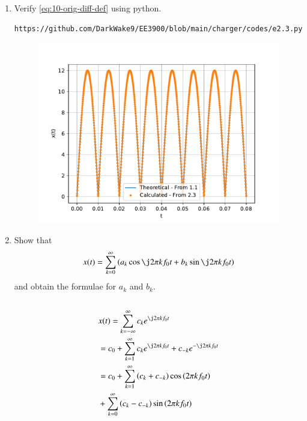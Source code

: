 \documentclass[journal,12pt,twocolumn]{IEEEtran}
\renewcommand\thesection{\arabic{section}}
\begin{document}
\begin{enumerate}[label=\thesection.\arabic*,ref=\thesection.\theenumi]
\item Verify 
	\eqref{eq:10-orig-diff-def}
	using python.
\begin{lstlisting}
https://github.com/DarkWake9/EE3900/blob/main/charger/codes/e2.3.py
\end{lstlisting}
\begin{figure}[!ht]
	\begin{center}
		\includegraphics[width=\columnwidth]{./figs/e2.3.pdf}
	\end{center}
	\label{fig:}	
\end{figure}	

\item Show that 
\begin{align}
	x(t) = \sum_{k = 0}^{\infty}\brak{a_k\cos{\j2\pi kf_0 t}+b_k\sin{\j2\pi kf_0 t}}
\label{eq:one-Z-real}
\end{align}
and obtain the formulae for $a_k$ and $b_k$.\\
\solution\\
\begin{align}
	&x(t) = \sum_{k = -\infty}^{\infty}c_ke^{\j2\pi kf_0 t} \\
	&= c_0 + \sum_{k = 1}^{\infty}c_ke^{\j2\pi kf_0t} + c_{-k}e^{-\j2\pi kf_0t} \\
	&= c_0 + \sum_{k = 1}^{\infty}\brak{c_k + c_{-k}}\cos\brak{2\pi kf_0t}  \nonumber \\
	&+ \sum_{k = 0}^{\infty}\brak{c_k - c_{-k}}\sin\brak{2\pi kf_0t}
\end{align}


\end{enumerate}
\end{document}
